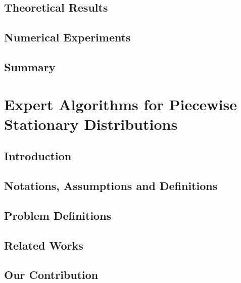 \documentclass[MS]{iitmdiss}
\begin{document}
\section{Theoretical Results}
\label{tbandit:results}



\section{Numerical Experiments}
\label{tbandit:expt}



\section{Summary}
\label{tbandit:conclusion}





\chapter{Expert Algorithms for Piecewise Stationary Distributions}
\label{chap:psbandit}

\section{Introduction}
\label{psbandit:intro}


\section{Notations, Assumptions and Definitions}
\label{psbandit:notations}


\section{Problem Definitions}
\label{psbandit:probDef}


\section{Related Works}
\label{psbandit:related}


\section{Our Contribution}
\label{psbandit:contribution}

\end{document}
